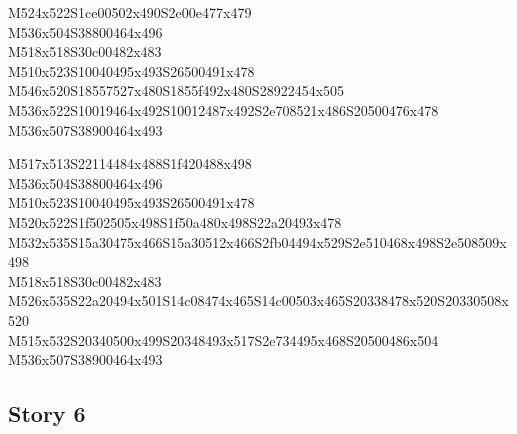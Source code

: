 \documentclass{article}
\begin{document}
\begin{multicols}{5}
\begin{center}
M524x522S1ce00502x490S2e00e477x479 %
\\M536x504S38800464x496 %
\\M518x518S30c00482x483 %
\\M510x523S10040495x493S26500491x478 %
\\M546x520S18557527x480S1855f492x480S28922454x505 %
\\M536x522S10019464x492S10012487x492S2e708521x486S20500476x478 %
\\M536x507S38900464x493 %
\vfil
\columnbreak

M517x513S22114484x488S1f420488x498 %
\\M536x504S38800464x496 %
\\M510x523S10040495x493S26500491x478 %
\\M520x522S1f502505x498S1f50a480x498S22a20493x478 %
\\M532x535S15a30475x466S15a30512x466S2fb04494x529S2e510468x498S2e508509x498 %
\\M518x518S30c00482x483 %
\\M526x535S22a20494x501S14c08474x465S14c00503x465S20338478x520S20330508x520 %
\\M515x532S20340500x499S20348493x517S2e734495x468S20500486x504 %
\\M536x507S38900464x493 %
\vfil

\end{center}
\end{multicols}

\subsection{Story 6}
\end{document}
